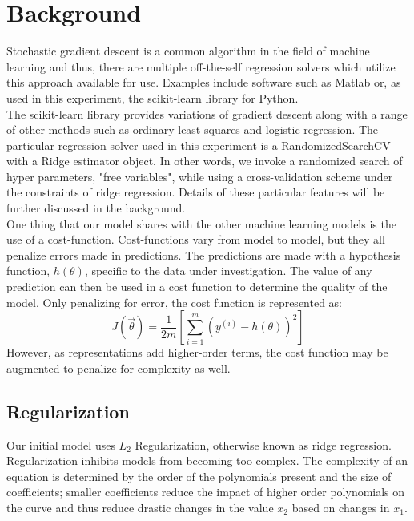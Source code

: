 
\section{Background}
\label{sec:background}

Stochastic gradient descent is a common algorithm in the field of machine
learning and thus, there are multiple off-the-self regression solvers which
utilize this approach available for use. Examples include software 
such as Matlab or, as used in this experiment, the scikit-learn library for Python.\\

The scikit-learn library provides variations of gradient descent along with 
a range of other methods such as ordinary least squares and logistic regression. 
The particular regression solver used in this experiment is a RandomizedSearchCV 
with a Ridge estimator object. In other words, we invoke a randomized search of 
hyper parameters, "free variables", while using a cross-validation scheme under 
the constraints of ridge regression. Details of these particular features will be
further discussed in the background.\\

One thing that our model shares with the other machine learning models  is
the use of a cost-function. Cost-functions vary from model to model, but they all 
penalize errors made in predictions. The predictions are made with a hypothesis 
function, $h(\theta)$, specific to the data under investigation. The value of any 
prediction can then be used in a cost function to determine the quality of the model. 
Only penalizing for error, the cost function is represented as: 
$$J(\vec{\theta}) = \frac{1}{2m} [\sum_{i = 1}^{m} (y^{(i)} - h(\theta))^2]$$
However, as representations add higher-order terms, 
the cost function may be augmented to penalize for complexity as well.


\subsection{Regularization}

Our initial model uses $L_{2}$ Regularization, otherwise known as ridge regression.
Regularization inhibits models from becoming too complex. The complexity of an equation is determined by the order of the polynomials present and the size of coefficients; smaller coefficients reduce the impact of higher order polynomials on the curve and thus reduce drastic changes in the value $x_{2}$ based on changes in $x_{1}$.\\

